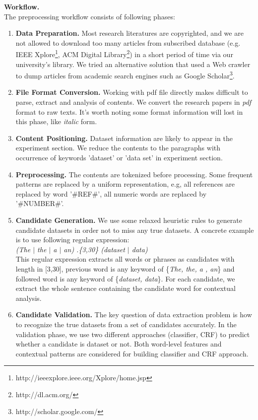 \documentclass[10pt]{article}
\begin{document}
\noindent \textbf{Workflow.} \\
The preprocessing workflow consists of following phases:
\begin{enumerate}
\item \textbf{Data Preparation.} Most research literatures are copyrighted, and we are not allowed to download too many articles from subscribed database (e.g. IEEE Xplore\footnote{http://ieeexplore.ieee.org/Xplore/home.jsp}, ACM Digital Library\footnote{http://dl.acm.org/}) in a short period of time via our university's library. We tried an alternative solution that used a Web crawler to dump articles from academic search engines such as Google Scholar\footnote{http://scholar.google.com/}.
\item \textbf{File Format Conversion.} Working with pdf file directly makes difficult to parse, extract and analysis of contents. We convert the research papers in \emph{pdf} format to raw texts. It's worth noting some format information will lost in this phase, like \emph{italic} form. 
\item \textbf{Content Positioning.} Dataset information are likely to appear in the experiment section. We reduce the contents to the paragraphs with occurrence of keywords 'dataset' or 'data set' in experiment section.
\item \textbf{Preprocessing.} The contents are tokenized before processing. Some frequent patterns are replaced by a uniform representation, e.g, all references are replaced by word '\#REF\#', all numeric words are replaced by '\#NUMBER\#'. 
\item \textbf{Candidate Generation.} We use some relaxed heuristic rules to generate candidate datasets in order not to miss any true datasets. A concrete example is to use following regular expression: \\
\textit{(The $|$ the $|$ a $|$ an) .\{3,30\} (dataset $|$ data)} \\
This regular expression extracts all words or phrases as candidates with length in [3,30], previous word is any keyword of \{\textit{The, the, a , an}\} and followed word is any keyword of \{\textit{dataset, data}\}. For each candidate, we extract the whole sentence containing the candidate word for contextual analysis.
\item \textbf{Candidate Validation.} The key question of data extraction problem is how to recognize the true datasets from a set of candidates accurately. In the validation phase, we use two different approaches (classifier, CRF) to predict whether a candidate is dataset or not. Both word-level features and contextual patterns are considered for building classifier and CRF approach.  
\end{enumerate}
\end{document}
